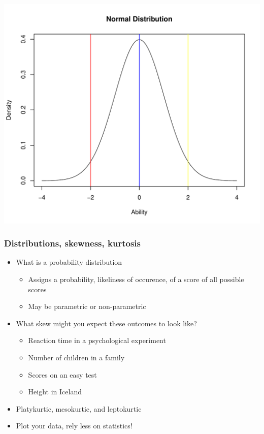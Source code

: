 \documentclass[dvipsnames]{beamer}\usepackage[]{graphicx}\usepackage[]{color}
\makeatletter
\def\maxwidth{ %
  \ifdim\Gin@nat@width>\linewidth
    \linewidth
  \else
    \Gin@nat@width
  \fi
}
\newenvironment{knitrout}{}{} %
\makeatother
\begin{document}
\begin{frame}
\begin{knitrout}
\color{fgcolor}

{\centering \includegraphics[width=\maxwidth]{figure/unnamed-chunk-8-1} 

}



\end{knitrout}
\end{frame}

\begin{frame}
\frametitle{Distributions, skewness, kurtosis}
  \begin{itemize}
    \item What is a probability distribution
  \begin{itemize}
    \item Assigns a probability, likeliness of occurence, of a score of all possible scores
    \item May be parametric or non-parametric
  \end{itemize}
  \item What skew might you expect these outcomes to look like?
    \begin{itemize}
    \item Reaction time in a psychological experiment
    \item Number of children in a family
    \item Scores on an easy test
    \item Height in Iceland
    \end{itemize}
  \item Platykurtic, mesokurtic, and leptokurtic
  \item Plot your data, rely less on statistics!
  \end{itemize}
\end{frame}
\end{document}

